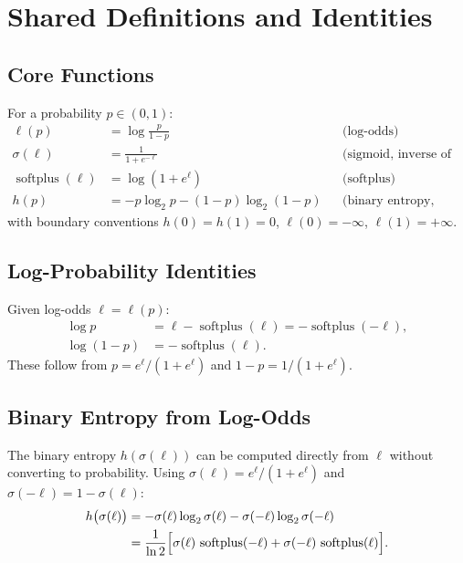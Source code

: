 \documentclass[11pt]{article}
\newcommand{\logodds}{\ell}
\newcommand{\sigmoid}{\sigma}
\DeclareMathOperator{\softplus}{softplus}
\begin{document}
\section{Shared Definitions and Identities}

\subsection{Core Functions}

For a probability $p \in (0,1)$:
\begin{align}
  \logodds(p)     &= \log\frac{p}{1-p}       & &\text{(log-odds)} \label{eq:logodds} \\[4pt]
  \sigmoid(\ell)  &= \frac{1}{1+e^{-\ell}}   & &\text{(sigmoid, inverse of log-odds)} \label{eq:sigmoid} \\[4pt]
  \softplus(\ell) &= \log(1 + e^{\ell})       & &\text{(softplus)} \label{eq:softplus} \\[4pt]
  h(p)            &= -p\log_2 p - (1{-}p)\log_2(1{-}p) & &\text{(binary entropy, bits)} \label{eq:binent}
\end{align}
with boundary conventions $h(0) = h(1) = 0$, $\logodds(0) = -\infty$,
$\logodds(1) = +\infty$.

\subsection{Log-Probability Identities}

Given log-odds $\ell = \logodds(p)$:
\begin{align}
  \log p     &= \ell - \softplus(\ell)   = -\softplus(-\ell), \label{eq:logp} \\
  \log(1-p)  &= -\softplus(\ell). \label{eq:log1mp}
\end{align}
These follow from $p = e^\ell / (1 + e^\ell)$ and $1 - p = 1/(1 + e^\ell)$.

\subsection{Binary Entropy from Log-Odds}

The binary entropy $h(\sigmoid(\ell))$ can be computed directly from
$\ell$ without converting to probability.  Using
$\sigmoid(\ell) = e^\ell/(1+e^\ell)$ and $\sigmoid(-\ell) = 1 - \sigmoid(\ell)$:
\begin{align}
  h\bigl(\sigmoid(\ell)\bigr)
  &= -\sigmoid(\ell)\log_2\sigmoid(\ell) - \sigmoid(-\ell)\log_2\sigmoid(-\ell) \notag \\
  &= \frac{1}{\ln 2}\Bigl[\sigmoid(\ell)\,\softplus(-\ell) + \sigmoid(-\ell)\,\softplus(\ell)\Bigr].
  \label{eq:hlogodds}
\end{align}
\end{document}
